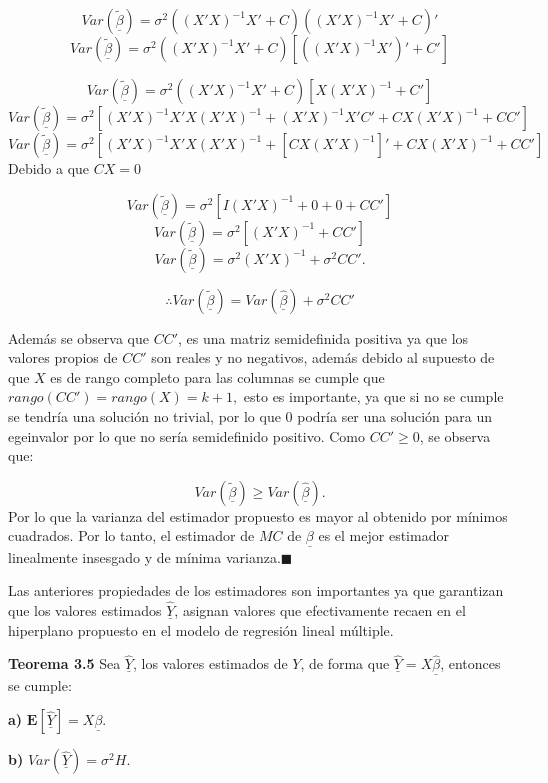 \documentclass[
  a4paper,
  oneside,
  openany]{book}
\begin{document}
\[Var\left(\underline{\tilde{\beta}}\right)=\sigma^2((X'X)^{-1}X'+C)((X'X)^{-1}X'+C)'\]
\[Var\left(\underline{\tilde{\beta}}\right)=\sigma^2((X'X)^{-1}X'+C)\left[ ((X'X)^{-1}X')'+C'\right]\]

\[Var\left(\underline{\tilde{\beta}}\right)=\sigma^2((X'X)^{-1}X'+C)[X(X'X)^{-1}+C']\]
\[Var\left(\underline{\tilde{\beta}}\right)=\sigma^2[(X'X)^{-1}X'X(X'X)^{-1}+(X'X)^{-1}X'C'+CX(X'X)^{-1}+CC']\]
\[Var\left(\underline{\tilde{\beta}}\right)=\sigma^2\left[(X'X)^{-1}X'X(X'X)^{-1}+[CX(X'X)^{-1}]'+CX(X'X)^{-1}+CC'\right]\]
Debido a que \(CX=0\)

\[Var\left(\underline{\tilde{\beta}}\right)=\sigma^2\left[ I(X'X)^{-1}+0+0+CC'\right]\]
\[Var\left(\underline{\tilde{\beta}}\right)=\sigma^2[(X'X)^{-1}+CC']\]
\[Var\left(\underline{\tilde{\beta}}\right)=\sigma^2(X'X)^{-1}+\sigma^2CC'.\]

\[\therefore Var\left(\underline{\tilde{\beta}}\right)=Var\left(\underline{\hat{\beta}}\right)+\sigma^2CC'\]

Además se observa que \(CC'\), es una matriz semidefinida positiva ya que los valores propios de \(CC'\) son reales y no negativos, además debido al supuesto de que \(X\) es de rango completo para las columnas se cumple que \(rango(CC')=rango(X)=k+1,\) esto es importante, ya que si no se cumple se tendría una solución no trivial, por lo que \(0\) podría ser una solución para un egeinvalor por lo que no sería semidefinido positivo. Como \(CC'\geq0\), se observa que:

\[Var\left(\underline{\tilde{\beta}}\right) \geq Var\left(\underline{\hat{\beta}}\right).\]
Por lo que la varianza del estimador propuesto es mayor al obtenido por mínimos cuadrados. Por lo tanto, el estimador de \(MC\) de \(\underline{\beta}\) es el mejor estimador linealmente insesgado y de mínima varianza.\(\blacksquare\)

Las anteriores propiedades de los estimadores son importantes ya que garantizan que los valores estimados \(\underline{\hat{Y}}\), asignan valores que efectivamente recaen en el hiperplano propuesto en el modelo de regresión lineal múltiple.

\textbf{Teorema 3.5} Sea \(\underline{\hat{Y}}\), los valores estimados de \(Y\), de forma que \(\underline{\hat{Y}}=X\underline{\hat{\beta}}\), entonces se cumple:

\textbf{a)} \(\mathbf{E}[\underline{\hat{Y}}]=X\underline{\beta}.\)

\textbf{b)} \(Var(\underline{\hat{Y}})=\sigma^2H.\)
\end{document}
